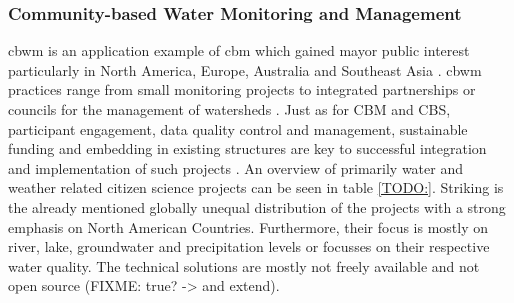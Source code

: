 \subsubsection*{Community-based Water Monitoring and Management}\label{subsubsec:cbwm}

\acrfull{cbwm} is an application example of \acrshort{cbm} which gained mayor public interest particularly in North America, Europe, Australia and Southeast Asia \autocite{kirschkeCitizenScienceProjects2022, koehlerCitizenParticipationCollaborative2008, livinglakescanadaElevatingCommunityBased2018}. \acrshort{cbwm} practices range from small monitoring projects to integrated partnerships or councils for the management of watersheds \autocite{westonCommunityBasedWaterMonitoring2015}. Just as for CBM and CBS, participant engagement, data quality control and management, sustainable funding and embedding in existing structures are key to successful integration and implementation of such projects \autocite{allenCommunityBasedWaterMonitoring2018,livinglakescanadaCommunityBasedWaterMonitoring2018,westonCommunityBasedWaterMonitoring2015}.
An overview of primarily water and weather related citizen science projects can be seen in table \ref{TODO:}. Striking is the already mentioned globally unequal distribution of the projects with a strong emphasis on North American Countries. Furthermore, their focus is mostly on river, lake, groundwater and precipitation levels or focusses on their respective water quality. The technical solutions are mostly not freely available and not open source (FIXME: true? -> and extend). 

